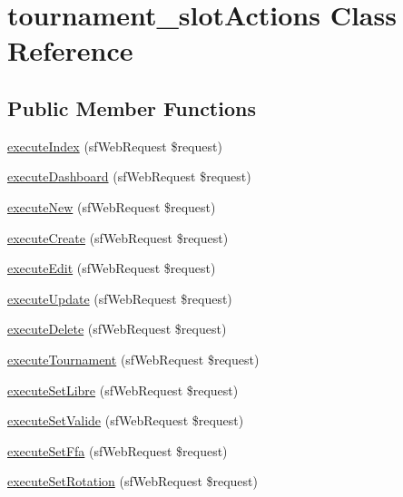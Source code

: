 \hypertarget{classtournament__slot_actions}{\section{tournament\-\_\-slot\-Actions Class Reference}
\label{classtournament__slot_actions}
}
\subsection*{Public Member Functions}
\begin{DoxyCompactItemize}
\item 
\hyperlink{classtournament__slot_actions_a948cc911eb1d9f77990be54af3b2080f}{execute\-Index} (sf\-Web\-Request \$request)
\item 
\hyperlink{classtournament__slot_actions_ab71c205bb28e89b189058a57b9400645}{execute\-Dashboard} (sf\-Web\-Request \$request)
\item 
\hyperlink{classtournament__slot_actions_a0ffbea56560c6c633dae68ec22aff21c}{execute\-New} (sf\-Web\-Request \$request)
\item 
\hyperlink{classtournament__slot_actions_a75837617743fb64dca82d8133b2c662a}{execute\-Create} (sf\-Web\-Request \$request)
\item 
\hyperlink{classtournament__slot_actions_af4d8fedd4b28f3398826a1bb8fa54394}{execute\-Edit} (sf\-Web\-Request \$request)
\item 
\hyperlink{classtournament__slot_actions_af7b4f51862add3c2ebb54efc136a0840}{execute\-Update} (sf\-Web\-Request \$request)
\item 
\hyperlink{classtournament__slot_actions_a52b5b11b11a0070dd2662257520c045a}{execute\-Delete} (sf\-Web\-Request \$request)
\item 
\hyperlink{classtournament__slot_actions_a6bd1c6b4d9724663290eb63011a2b048}{execute\-Tournament} (sf\-Web\-Request \$request)
\item 
\hyperlink{classtournament__slot_actions_ade718601d101609816d654e11ca53f3b}{execute\-Set\-Libre} (sf\-Web\-Request \$request)
\item 
\hyperlink{classtournament__slot_actions_a2e6f1c735e3cc85dac014ccc9a7dd60c}{execute\-Set\-Valide} (sf\-Web\-Request \$request)
\item 
\hyperlink{classtournament__slot_actions_abfdc34e09fc4c1d8a5eccea8b493d6c7}{execute\-Set\-Ffa} (sf\-Web\-Request \$request)
\item 
\hyperlink{classtournament__slot_actions_ad9a43a2a4ecb0ec8c327defed6cbfb50}{execute\-Set\-Rotation} (sf\-Web\-Request \$request)

\end{DoxyCompactItemize}
